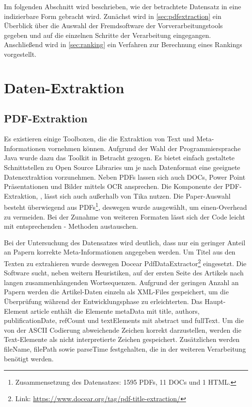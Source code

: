 


Im folgenden Abschnitt wird beschrieben, wie der betrachtete Datensatz in eine indizierbare Form
gebracht wird. Zunächst wird in \autoref{sec:pdfextraction} ein
Überblick über die Auswahl der Fremdsoftware der Vorverarbeitungstools
gegeben und auf die einzelnen Schritte der Verarbeitung eingegangen. Anschließend wird
in \autoref{sec:ranking} ein Verfahren zur Berechnung eines Rankings vorgestellt.



\section{Daten-Extraktion}\label{sec:pdfextraction}


\subsection{PDF-Extraktion}\label{sec:preprosselection}

Es existieren einige Toolboxen, die die Extraktion von Text und
Meta-Informationen vornehmen können.  Aufgrund der Wahl der
Programmiersprache Java wurde dazu das \tika Toolkit in Betracht
gezogen. Es bietet einfach gestaltete Schnittstellen zu Open Source
Libraries um je nach Datenformat eine geeignete Datenextraktion
vorzunehmen. Neben PDFs lassen sich auch DOCs, Power Point
Präsentationen und Bilder mittels OCR ansprechen. Die Komponente der
PDF-Extraktion, \pdfbox, lässt sich auch außerhalb von Tika nutzen.
Die Paper-Auswahl besteht überwiegend aus PDFs\footnote{Zusammensetzung des Datensatzes: 1595 PDFs, 11
DOCs und 1 HTML.}, deswegen wurde \pdfbox ausgewählt, um einen-Overhead
zu vermeiden. Bei der Zunahme von weiteren Formaten lässt sich der
Code leicht mit entsprechenden \tika - Methoden austauschen.

Bei der Untersuchung des Datensatzes wird deutlich, dass nur ein
geringer Anteil an Papern korrekte Meta-Informationen angegeben werden. Um
Titel aus den Texten zu extrahieren wurde deswegen Docear
PdfDataExtractor\footnote{Link:
  \url{https://www.docear.org/tag/pdf-title-extraction/}}
eingesetzt. Die Software sucht, neben weitern Heuristiken, auf der
ersten Seite des Artikels nach langen zusammenhängenden Wortsequenzen.
Aufgrund der geringen Anzahl an Papern werden die Artikel-Daten
einzeln als XML-Files gespeichert, um die Überprüfung während der
Entwicklungsphase zu erleichterten. Das Haupt-Element article enthält
die Elemente metaData mit title, authors, publificationDate, refCount
und textElements mit abstract und fullText.  Um die von der ASCII
Codierung abweichende Zeichen korrekt darzustellen, werden die
Text-Elemente als nicht interpretierte Zeichen gespeichert.
Zusätzlichen werden fileName, filePath sowie parseTime festgehalten,
die in der weiteren Verarbeitung benötigt werden.

